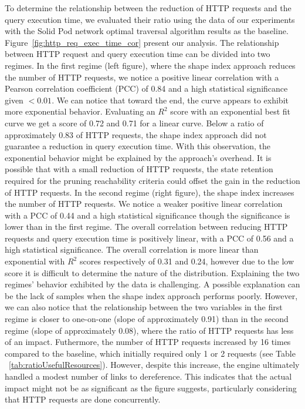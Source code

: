 To determine the relationship between the reduction of HTTP requests and the query execution time, we evaluated their ratio using 
the data of our experiments with the Solid Pod network optimal traversal algorithm results as the baseline.
Figure~\ref{fig:http_req_exec_time_cor} present our analysis.
The relationship between HTTP request and query execution time can be divided into two regimes.
In the first regime (left figure), where the shape index approach reduces the number of HTTP requests, we notice a positive linear correlation with a
Pearson correlation coefficient (PCC) of 0.84 and a high statistical significance given $< 0.01$.
We can notice that toward the end, the curve appears to exhibit more exponential behavior.
Evaluating an $R^2$ score with an exponential best fit curve we get a score of 0.72 and 0.71 for a linear curve.
Below a ratio of approximately 0.83 of HTTP requests, the shape index approach did not guarantee a reduction in query execution time.
With this observation, the exponential behavior might be explained by the approach's overhead. 
It is possible that with a small reduction of HTTP requests, the state retention required for the pruning reachability criteria could offset the gain in the reduction of HTTP requests.
In the second regime (right figure), the shape index increases the number of HTTP requests.
We notice a weaker positive linear correlation with a PCC of 0.44 and a high statistical significance though the significance is lower than in the first regime.
The overall correlation between reducing HTTP requests and query execution time is positively linear, with a PCC of 0.56 and a high statistical significance.
The overall correlation is more linear than exponential with $R^2$ scores respectively of 0.31 and 0.24, however due to the low score it is difficult to determine the nature of the distribution.
Explaining the two regimes' behavior exhibited by the data is challenging.
A possible explanation can be the lack of samples when the shape index approach performs poorly.
However, we can also notice that the relationship between the two variables in the first regime is closer to one-on-one (slope of approximately 0.91) than in the second regime (slope of approximately 0.08), where the ratio of HTTP requests has less of an impact.
Futhermore, the number of HTTP requests increased by 16 times compared to the baseline, which initially required only 1 or 2 requests (see Table ~\ref{tab:ratioUsefulResources}). 
However, despite this increase, the engine ultimately handled a modest number of links to dereference.
This indicates that the actual impact might not be as significant as the figure suggests, particularly considering that HTTP requests are done concurrently.
